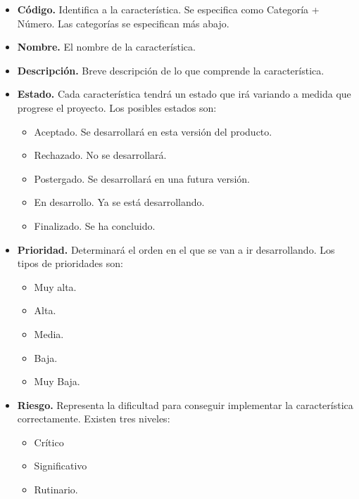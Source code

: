 \documentclass[a4paper,oneside,11pt]{book}
\begin{document}
\begin{itemize}
\item \textbf{Código.} Identifica a la característica. Se especifica como Categoría + Número. Las categorías se especifican más abajo.
\item \textbf{Nombre.} El nombre de la característica.
\item \textbf{Descripción.} Breve descripción de lo que comprende la característica.
\item \textbf{Estado.} Cada característica tendrá un estado que irá variando a medida que progrese el proyecto. Los posibles estados son:
	\begin{itemize}
		\item Aceptado. Se desarrollará en esta versión del producto.
		\item Rechazado. No se desarrollará.
		\item Postergado. Se desarrollará en una futura versión.
		\item En desarrollo. Ya se está desarrollando.
		\item Finalizado. Se ha concluido.
	\end{itemize}
\item \textbf{Prioridad.} Determinará el orden en el que se van a ir desarrollando. Los tipos de prioridades son:
	\begin{itemize}
		\item Muy alta.
		\item Alta.
		\item Media.
		\item Baja.
		\item Muy Baja.
	\end{itemize}
\item \textbf{Riesgo.} Representa la dificultad para conseguir implementar la característica correctamente. Existen tres niveles: 
	\begin{itemize}
		\item Crítico
		\item Significativo
		\item Rutinario.
	\end{itemize}
\end{itemize}

\end{document}
